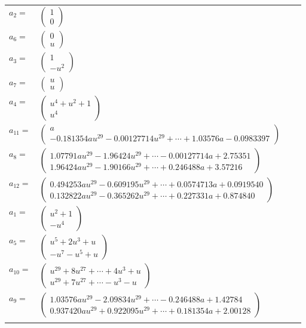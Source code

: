 \documentclass[1p]{elsarticle_modified}
\theoremstyle{definition}
\begin{document}
\begin{tabular}{m{7pt} m{180pt} m{7pt} m{180pt} }
\flushright $a_{2}=$&$\begin{pmatrix}1\\0\end{pmatrix}$ \\
\flushright $a_{6}=$&$\begin{pmatrix}0\\u\end{pmatrix}$ \\
\flushright $a_{3}=$&$\begin{pmatrix}1\\- u^2\end{pmatrix}$ \\
\flushright $a_{7}=$&$\begin{pmatrix}u\\u\end{pmatrix}$ \\
\flushright $a_{4}=$&$\begin{pmatrix}u^4+u^2+1\\u^4\end{pmatrix}$ \\
\flushright $a_{11}=$&$\begin{pmatrix}a\\-0.181354 a u^{29}-0.00127714 u^{29}+\cdots+1.03576 a-0.0983397\end{pmatrix}$ \\
\flushright $a_{8}=$&$\begin{pmatrix}1.07791 a u^{29}-1.96424 u^{29}+\cdots-0.00127714 a+2.75351\\1.96424 a u^{29}-1.90166 u^{29}+\cdots+0.246488 a+3.57216\end{pmatrix}$ \\
\flushright $a_{12}=$&$\begin{pmatrix}0.494253 a u^{29}-0.609195 u^{29}+\cdots+0.0574713 a+0.0919540\\0.132822 a u^{29}-0.365262 u^{29}+\cdots+0.227331 a+0.874840\end{pmatrix}$ \\
\flushright $a_{1}=$&$\begin{pmatrix}u^2+1\\- u^4\end{pmatrix}$ \\
\flushright $a_{5}=$&$\begin{pmatrix}u^5+2 u^3+u\\- u^7- u^5+u\end{pmatrix}$ \\
\flushright $a_{10}=$&$\begin{pmatrix}u^{29}+8 u^{27}+\cdots+4 u^3+u\\u^{29}+7 u^{27}+\cdots- u^3- u\end{pmatrix}$ \\
\flushright $a_{9}=$&$\begin{pmatrix}1.03576 a u^{29}-2.09834 u^{29}+\cdots-0.246488 a+1.42784\\0.937420 a u^{29}+0.922095 u^{29}+\cdots+0.181354 a+2.00128\end{pmatrix}$\\&\end{tabular}
\end{document}

